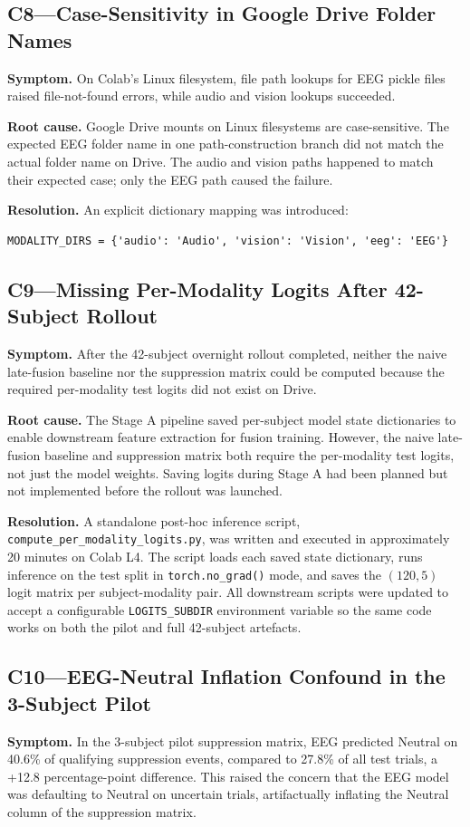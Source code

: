 \subsection*{C8---Case-Sensitivity in Google Drive Folder Names}
\textbf{Symptom.} On Colab's Linux filesystem, file path lookups for EEG pickle files raised file-not-found errors, while audio and vision lookups succeeded.

\textbf{Root cause.} Google Drive mounts on Linux filesystems are case-sensitive. The expected EEG folder name in one path-construction branch did not match the actual folder name on Drive. The audio and vision paths happened to match their expected case; only the EEG path caused the failure.

\textbf{Resolution.} An explicit dictionary mapping was introduced:

\begin{verbatim}
MODALITY_DIRS = {'audio': 'Audio', 'vision': 'Vision', 'eeg': 'EEG'}
\end{verbatim}

\subsection*{C9---Missing Per-Modality Logits After 42-Subject Rollout}
\textbf{Symptom.} After the 42-subject overnight rollout completed, neither the naive late-fusion baseline nor the suppression matrix could be computed because the required per-modality test logits did not exist on Drive.

\textbf{Root cause.} The Stage A pipeline saved per-subject model state dictionaries to enable downstream feature extraction for fusion training. However, the naive late-fusion baseline and suppression matrix both require the per-modality test logits, not just the model weights. Saving logits during Stage A had been planned but not implemented before the rollout was launched.

\textbf{Resolution.} A standalone post-hoc inference script, \texttt{compute\_per\_modality\_logits.py}, was written and executed in approximately 20 minutes on Colab L4. The script loads each saved state dictionary, runs inference on the test split in \texttt{torch.no\_grad()} mode, and saves the $(120,5)$ logit matrix per subject-modality pair. All downstream scripts were updated to accept a configurable \texttt{LOGITS\_SUBDIR} environment variable so the same code works on both the pilot and full 42-subject artefacts.

\subsection*{C10---EEG-Neutral Inflation Confound in the 3-Subject Pilot}
\textbf{Symptom.} In the 3-subject pilot suppression matrix, EEG predicted Neutral on 40.6\% of qualifying suppression events, compared to 27.8\% of all test trials, a +12.8 percentage-point difference. This raised the concern that the EEG model was defaulting to Neutral on uncertain trials, artifactually inflating the Neutral column of the suppression matrix.

